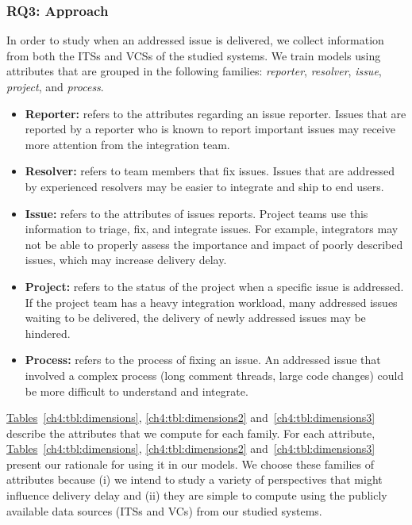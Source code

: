 \subsubsection*{RQ3: Approach} 

In order to study when an addressed issue is delivered, we collect information from
both the ITSs and VCSs of the studied systems. We train models using attributes
that are grouped in the following families: \textit{reporter},
\textit{resolver}, \textit{issue}, \textit{project}, and \textit{process}.
\begin{itemize}
	\item \textbf{Reporter:} refers to the attributes regarding an issue reporter.
		Issues that are reported by a reporter who is known to report important
		issues may receive more attention from the integration team.\\

	\item \textbf{Resolver:} refers to team members that fix issues.
		Issues that are addressed by experienced resolvers may be easier
		to integrate and ship to end users.\\

	\item \textbf{Issue:} refers to the attributes of issues reports. Project teams use this
		information to triage, fix, and integrate issues. For
		example, integrators may not be able to properly assess the
		importance and impact of poorly described issues, which may
		increase delivery delay.\\

	\item \textbf{Project:} refers to the status of the project when a
		specific issue is addressed. If the project team has a heavy
		integration workload, \ie many addressed issues waiting to be
		delivered, the delivery of newly addressed issues may be
		hindered.\\

	\item \textbf{Process:} refers to the process of fixing an issue. An
		addressed issue that involved a complex process (\eg long comment
		threads, large code changes) could be more difficult to
		understand and integrate.\\
\end{itemize}

\hyperref[ch4:tbl:dimensions]{Tables}~\ref{ch4:tbl:dimensions},
\ref{ch4:tbl:dimensions2} and~\ref{ch4:tbl:dimensions3} describe the attributes
that we compute for each family. For each attribute,
\hyperref[ch4:tbl:dimensions]{Tables}~\ref{ch4:tbl:dimensions},
\ref{ch4:tbl:dimensions2} and~\ref{ch4:tbl:dimensions3} present our rationale
for using it in our models. We choose these families of attributes because (i)
we intend to study a variety of perspectives that might influence delivery delay
and (ii) they are simple to compute using the publicly available data sources
(\eg ITSs and VCs) from our studied systems.

